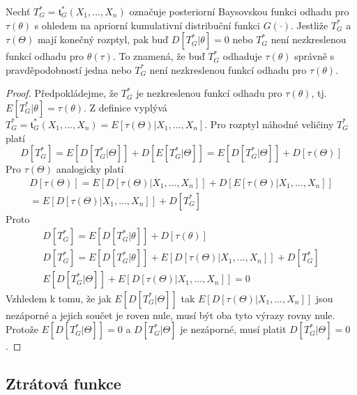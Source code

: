 \begin{theorem}
Nechť $T_G^* = \mathfrak{t}_G^*(X_1, ..., X_n)$ označuje posteriorní Baysovskou funkci odhadu pro $\tau(\theta)$ s ohledem na apriorní kumulativní distribuční funkci $G(\cdot)$. Jestliže $T_G^*$ a $\tau(\Theta)$ mají konečný rozptyl, pak buď $D[T_G^*|\theta] = 0$ nebo $T_G^*$ není nezkreslenou funkcí odhadu pro $\theta(\tau)$. To znamená, že buď $T_G^*$ odhaduje $\tau(\theta)$ správně s pravděpodobností jedna nebo $T_G^*$ není nezkreslenou funkcí odhadu pro $\tau(\theta)$.
\end{theorem}

\begin{proof}
Předpokládejme, že $T_G^*$ je nezkreslenou funkcí odhadu pro $\tau(\theta)$, tj. $E[T_G^*|\theta] = \tau(\theta)$. Z definice vyplývá $T_G^* = \mathfrak{t}_G^*(X_1, ..., X_n) = E[\tau(\Theta)|X_1, ..., X_n]$. Pro rozptyl náhodné veličiny $T_G^*$ platí
\begin{equation*}
D[T_G^*] = E[D[T_G^*|\Theta]] + D[E[T_G^*|\Theta]] = E[D[T_G^*|\Theta]] + D[\tau(\Theta)]
\end{equation*}
Pro $\tau(\Theta)$ analogicky platí
\begin{gather*}
D[\tau(\Theta)] = E[D[\tau(\Theta)|X_1, ..., X_n]] + D[E[\tau(\Theta)|X_1, ..., X_n]]\\
= E[D[\tau(\Theta)|X_1, ..., X_n]] + D[T_G^*]
\end{gather*}
Proto
\begin{gather*}
D[T_G^*] = E[D[T_G^*|\theta]] + D[\tau(\theta)]\\
D[T_G^*] = E[D[T_G^*|\theta]] + E[D[\tau(\Theta)|X_1, ..., X_n]] + D[T_G^*]\\
E[D[T_G^*|\Theta]] + E[D[\tau(\Theta)|X_1, ..., X_n]] = 0
\end{gather*}
Vzhledem k tomu, že jak $E[D[T_G^*|\Theta]]$ tak $E[D[\tau(\Theta)|X_1, ..., X_n]]$ jsou nezáporné a jejich součet je roven nule, musí být oba tyto výrazy rovny nule. Protože $E[D[T_G^*|\Theta]] = 0$ a $D[T_G^*|\Theta]$ je nezáporné, musí platit $D[T_G^*|\Theta] = 0$. 
\end{proof}

\subsection{Ztrátová funkce}


